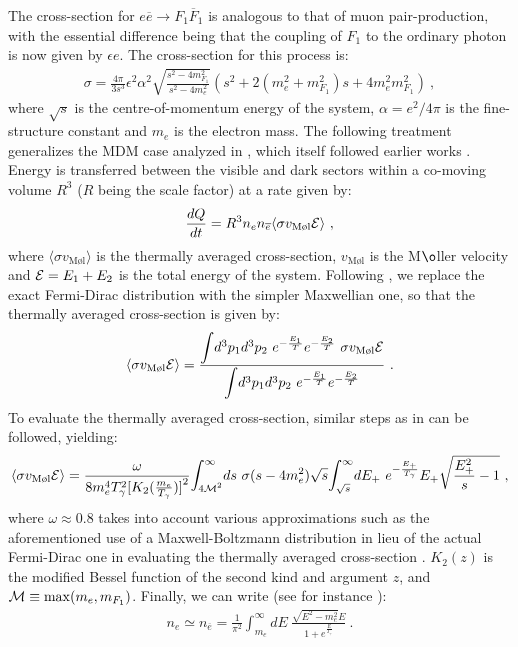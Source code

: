 \documentclass[12pt]{article}
\begin{document}
The cross-section for $e \overline{e} \rightarrow F_1 \overline{F}_1$ is analogous to that of muon pair-production, with the essential difference being that the coupling of $F_1$ to the ordinary photon is now given by $\epsilon e$. The cross-section for this process is:
%
\begin{eqnarray}
\sigma = \frac{4\pi}{3s^3} \epsilon ^2 \alpha ^2 \sqrt{\frac{s^2 - 4 m _{F_1} ^2}{s^2 - 4 m _{e} ^2}} \left (s^2 + 2 \left (m _{e} ^2 + m _{F_1} ^2 \right )s + 4m _{e} ^2 m _{F_1} ^2 \right ) \ ,
\end{eqnarray}
%
where $\sqrt{s}$ is the centre-of-momentum energy of the system, $\alpha = e^2/4\pi$ is the fine-structure constant and $m _{e}$ is the electron mass. The following treatment generalizes the MDM case analyzed in \cite{predictions}, which itself followed earlier works \cite{updated,carlson,ciarcellutiliege}. Energy is transferred between the visible and dark sectors within a co-moving volume $R^3$ ($R$ being the scale factor) at a rate given by:
%
\begin{eqnarray}
\frac{dQ}{dt} = R^3 n _{e} n _{\overline{e}} \langle \sigma v_{\text{M\o l}} {\cal E} \rangle \ ,
\label{dqdt}
\end{eqnarray}
%
where $\langle \sigma v_{\text{M\o l}} \rangle$ is the thermally averaged cross-section, $ v_{\text{M\o l}}$ is the M$\o$ller velocity and ${\cal E} = E_1 + E_2$ is the total energy of the system. Following \cite{ciarcellutiliege,gondologelmini}, we replace the exact Fermi-Dirac distribution with the simpler Maxwellian one, so that the thermally averaged cross-section is given by:
%
\begin{eqnarray}
\langle \sigma v_{\text{M\o l}} {\cal E} \rangle = \frac{\mathlarger \int d^3p_1 d^3p_2 \ e^{-\frac{E_1}{T}} e^{-\frac{E_2}{T}} \ \sigma v_{\text{M\o l}}{\cal E}}{\mathlarger \int d^3p_1 d^3p_2 \ e^{-\frac{E_1}{T}}e^{-\frac{E_2}{T}}} \ .
\end{eqnarray}
%
To evaluate the thermally averaged cross-section, similar steps as in \cite{ciarcellutiliege,gondologelmini} can be followed, yielding:
%
\begin{eqnarray}
\langle \sigma v_{\text{M\o l}}{\cal E} \rangle = 
\frac{\omega}{8m_e^4 T_{\gamma}^2 {[K_2(\frac{m_e}{T_{\gamma}})]}^2}
\mathlarger \int _{4{\cal M}^2}^{\infty} ds \ \sigma (s - 4m_e^2)
\sqrt{s} \mathlarger \int _{\sqrt{s}}^{\infty} dE_+ \ e^{-\frac{E_+}{T _{\gamma}}} E_+ \sqrt{\frac{E _+ ^2}{s} - 1} \ ,
\label{sig}
\end{eqnarray}
%
where $\omega \approx 0.8$ takes into account various approximations such as the aforementioned use of a Maxwell-Boltzmann distribution in lieu of the actual Fermi-Dirac one in evaluating the thermally averaged cross-section \cite{ciarcellutiliege}. $K_2(z)$ is the modified Bessel function of the second kind and argument $z$, and ${\cal M} \equiv \max(m _e, m _{F_1})$. Finally, we can write (see for instance \cite{earlyuniverse}):
%
\begin{eqnarray}
n _{e} \simeq n _{\overline{e}} = \frac{1}{\pi ^2} \int _{m_e} ^{\infty} dE \ \frac{\sqrt{E^2 - m _e ^2}E}{1 + e^{\frac{E}{T _{\gamma}}}} \ .
\end{eqnarray}
%
\end{document}

